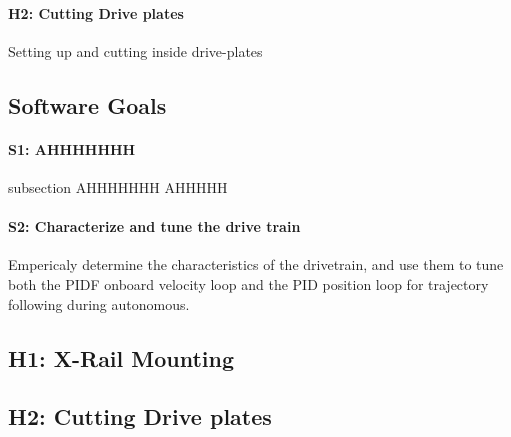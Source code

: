 \documentclass{article}
\begin{document}
\paragraph{H2: Cutting Drive plates}
Setting up and cutting inside drive-plates
\subsection{Software Goals}
\paragraph{S1: AHHHHHHH}
subsection {AHHHHHHH}
AHHHHH

\paragraph{S2: Characterize and tune the drive train}
 Empericaly determine the characteristics of the drivetrain, and use them to tune both the PIDF onboard velocity loop and the PID position loop for trajectory following during autonomous. 
\newpage
\subsection{H1: X-Rail Mounting}

\subsection{H2: Cutting Drive plates}
\end{document}
